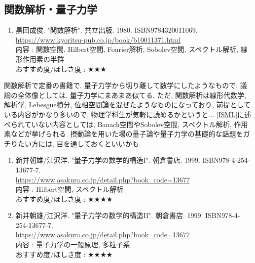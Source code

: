 \documentclass[10pt,a4paper]{jsarticle}
\begin{document}
\subsection{関数解析・量子力学}
    \begin{enumerate}
        \renewcommand{\theenumi}{[FA\arabic{enumi}]}
        \renewcommand{\labelenumi}{\theenumi}
        \setcounter{enumi}{0}
        \item \label{KNFA} 黒田成俊. "関数解析". 共立出版. 1980. ISBN9784320011069. \\
        \url{https://www.kyoritsu-pub.co.jp/book/b10011371.html} \\
        内容 : 関数空間, Hilbert空間, Fourier解析, Sobolev空間, スペクトル解析, 線形作用素の半群\\
        おすすめ度/ほしさ度 : $\bigstar \bigstar \bigstar $
    \end{enumerate}\par 
    関数解析で定番の書籍で, 量子力学から切り離して数学にしたようなもので, 議論の全体像としては, 量子力学にまあまあ似てる. ただ, 関数解析は線形代数学, 解析学, Lebesgue積分, 位相空間論を混ぜたようなものになっており, 前提としている内容がかなり多いので, 物理学科生が気軽に読めるかというと... \ref{ISML}に述べられていない内容としては, Banach空間やSobolev空間, スペクトル解析, 作用素などが挙げられる. 摂動論を用いた場の量子論や量子力学の基礎的な話題をガチりたい方には, 目を通しておくといいかも. 
    \begin{enumerate}
        \renewcommand{\theenumi}{[FA\arabic{enumi}]}
        \renewcommand{\labelenumi}{\theenumi}
        \setcounter{enumi}{1}
        \item \label{AAFA1} 新井朝雄/江沢洋. "量子力学の数学的構造I". 朝倉書店. 1999. ISBN978-4-254-13677-7. \\
        \url{https://www.asakura.co.jp/detail.php?book_code=13677} \\
        内容 : Hilbert空間, スペクトル解析\\
        おすすめ度/ほしさ度 : $\bigstar \bigstar \bigstar \bigstar $
        \item \label{AAFA2} 新井朝雄/江沢洋. "量子力学の数学的構造II". 朝倉書店. 1999. ISBN978-4-254-13677-7. \\
        \url{https://www.asakura.co.jp/detail.php?book_code=13677} \\
        内容 : 量子力学の一般原理, 多粒子系\\
        おすすめ度/ほしさ度 : $\bigstar \bigstar \bigstar \bigstar $
    \end{enumerate}\par 
\end{document}
